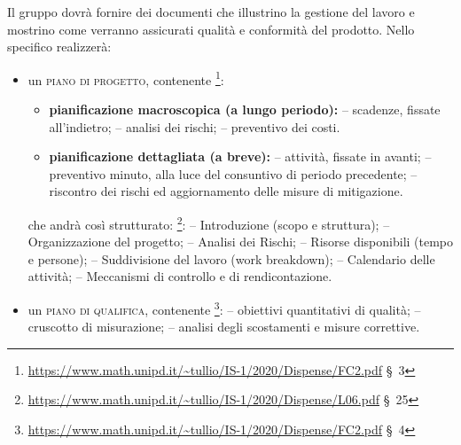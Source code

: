 
        \label{pianificazione}
            Il gruppo dovrà fornire dei documenti che illustrino la gestione del lavoro e mostrino come verranno assicurati qualità e conformità del prodotto. Nello specifico realizzerà:
            \begin{itemize}
                \item un \textsc{piano di progetto}, contenente \footnote{\url{https://www.math.unipd.it/~tullio/IS-1/2020/Dispense/FC2.pdf} \S\ 3}:
                    \begin{itemize}
                        \item \textbf{pianificazione macroscopica (a lungo periodo):}
                            \subitem -- scadenze, fissate all'indietro;
                            \subitem -- analisi dei rischi;
                            \subitem -- preventivo dei costi.
                        \item \textbf{pianificazione dettagliata (a breve):}
                            \subitem -- attività, fissate in avanti;
                            \subitem -- preventivo minuto, alla luce del consuntivo di periodo precedente;
                            \subitem -- riscontro dei rischi ed aggiornamento delle misure di mitigazione.
                    \end{itemize}

                    che andrà così strutturato: \footnote{\url{https://www.math.unipd.it/~tullio/IS-1/2020/Dispense/L06.pdf} \S\ 25}:
                    \subitem -- Introduzione (scopo e struttura);
                    \subitem -- Organizzazione del progetto;
                    \subitem -- Analisi dei Rischi;
                    \subitem -- Risorse disponibili (tempo e persone);
                    \subitem -- Suddivisione del lavoro (work breakdown);
                    \subitem -- Calendario delle attività;
                    \subitem -- Meccanismi di controllo e di rendicontazione.

                \item un \textsc{piano di qualifica}, contenente \footnote{\url{https://www.math.unipd.it/~tullio/IS-1/2020/Dispense/FC2.pdf} \S\ 4}:
                    \subitem -- obiettivi quantitativi di qualità;
                    \subitem -- cruscotto di misurazione;
                    \subitem -- analisi degli scostamenti e misure correttive.
            \end{itemize}

